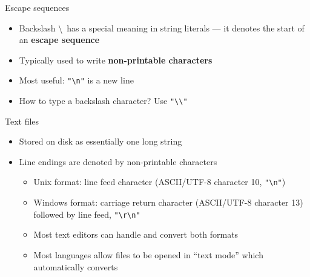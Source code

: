\begin{frame}[fragile]{Escape sequences}
    \begin{itemize}
        \pause\item Backslash \textbackslash\ has a special meaning in string literals
            --- it denotes the start of an \textbf{escape sequence}
        \pause\item Typically used to write \textbf{non-printable characters}
        \pause\item Most useful: \lstinline{"\n"} is a new line
        \pause\item How to type a backslash character? Use \lstinline{"\\"}
    \end{itemize}
\end{frame}


\begin{frame}[fragile]{Text files}
    \begin{itemize}
        \pause\item Stored on disk as essentially one long string
        \pause\item Line endings are denoted by non-printable characters
            \begin{itemize}
                \pause\item Unix format: line feed character (ASCII/UTF-8 character 10, \lstinline{"\n"})
                \pause\item Windows format: carriage return character (ASCII/UTF-8 character 13) followed by line feed, \lstinline{"\r\n"}
                \pause\item Most text editors can handle and convert both formats
                \pause\item Most languages allow files to be opened in ``text mode'' which automatically converts
            \end{itemize}
    \end{itemize}
\end{frame}

